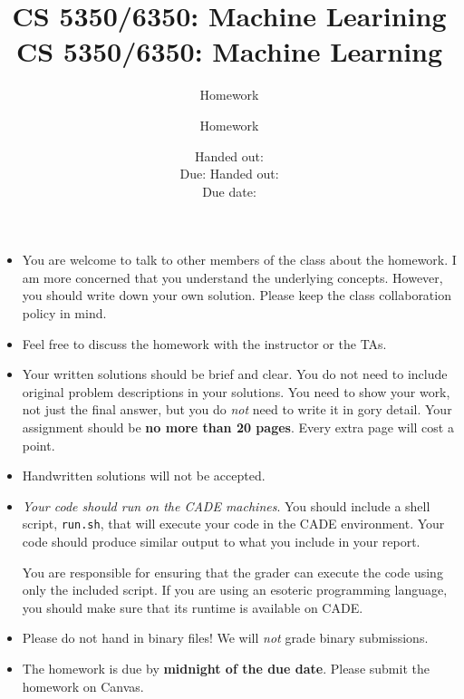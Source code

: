 \documentclass[12pt, fullpage,letterpaper]{article}
\title{CS 5350/6350: Machine Learining \semester}
\author{Homework \assignmentId}
\date{Handed out: \releaseDate\\
	Due: \dueDate}
\title{CS 5350/6350: Machine Learning \semester}
\author{Homework \assignmentId}
\date{Handed out: \releaseDate\\
  Due date: \dueDate}
\begin{document}
\maketitle


{\footnotesize
	\begin{itemize}
		\item You are welcome to talk to other members of the class about
		the homework. I am more concerned that you understand the
		underlying concepts. However, you should write down your own
		solution. Please keep the class collaboration policy in mind.
		
		\item Feel free to discuss the homework with the instructor or the TAs.
		
		\item Your written solutions should be brief and clear. You do not need to include original problem descriptions in your solutions. You need to
		show your work, not just the final answer, but you do \emph{not}
		need to write it in gory detail. Your assignment should be {\bf no
			more than 20 pages}. Every extra page will cost a point.
		
		\item Handwritten solutions will not be accepted.
		
		
		\item {\em Your code should run on the CADE machines}. You should
		include a shell script, {\tt run.sh}, that will execute your code
		in the CADE environment. Your code should produce similar output
		to what you include in your report.
		
		You are responsible for ensuring that the grader can execute the
		code using only the included script. If you are using an
		esoteric programming language, you should make sure that its
		runtime is available on CADE.
		
		\item Please do not hand in binary files! We will {\em not} grade
		binary submissions.
		
		\item The homework is due by \textbf{midnight of the due date}. Please submit
		the homework on Canvas.
		
	\end{itemize}
}
\end{document}
